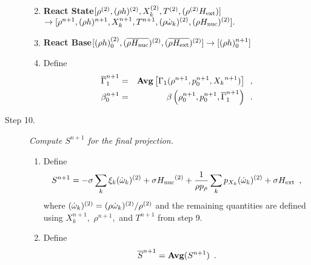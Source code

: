 \begin{description}
\begin{enumerate}
\renewcommand{\theenumi}{{\bf \alph{enumi}}}

\item {\bf React State}$[\rho^{(2)},(\rho h)^{(2)}, X_k^{(2)},T^{(2)}, (\rho^{(2)} {H_{\rm ext}}) ]$\\
                   $\rightarrow [\rho^{n+1}, (\rho h)^{n+1}, X_k^{n+1}, T^{n+1}, 
                               (\rho \dot{\omega}_k)^{(2)}, (\rho {H_{\rm nuc}})^{(2)} ].$  

\item {\bf React Base}$[(\rho h)_0^{(2)},(\overline{\rho {H_{\rm nuc}}})^{(2)},(\overline{\rho{H_{\rm ext}}})^{(2)}] \rightarrow [(\rho h)_0^{n+1}]$

\item Define
\begin{eqnarray}
 \overline{\Gamma}_1^{n+1}    &=& {\rm{\bf Avg}}\left[\Gamma_1(\rho^{n+1}, p_0^{n+1}, {X_k}^{n+1}) \right] \enskip , \\ 
 {\beta   }_0^{n+1}    &=& \beta   \left(\rho_0^{n+1}, p_0^{n+1},   \overline{\Gamma}_1^{n+1}\right) \enskip .
\end{eqnarray}

\end{enumerate}

\item[Step 10.] {\em Compute $S^{n+1}$ for the final projection.}

\begin{enumerate}
\renewcommand{\theenumi}{{\bf \alph{enumi}}}
\item Define
\begin{equation}
  S^{n+1} =  -\sigma  \sum_k  \xi_k (\dot{\omega}_k)^{(2)}  + \sigma {H_{\rm nuc}}^{(2)} +
  \frac{1}{\rho p_\rho} \sum_k p_{X_k}  ({\dot{\omega}}_k)^{(2)}  
   + \sigma {H_{\rm ext}} \enskip ,
\end{equation}
where $(\dot{\omega}_k)^{(2)} = (\rho \dot{\omega}_k)^{(2)} / \rho^{(2)}$
and the remaining quantities are defined using $X_k^{n+1},$ $\rho^{n+1},$
and $T^{n+1}$ from step 9.

\item Define
\begin{equation}
\overline{S}^{n+1} = {\mathrm{\bf Avg}} (S^{n+1}) \enskip.
\end{equation}

\end{enumerate}



\end{description}
